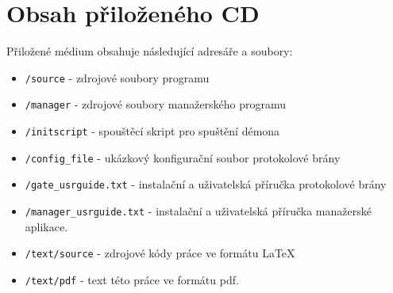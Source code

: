 \chapter{Obsah přiloženého CD}
\label{kap_obsah_cd}
Přiložené médium obsahuje následující adresáře a soubory:
\begin{itemize}
	\item \verb|/source| - zdrojové soubory programu
	\item \verb|/manager| - zdrojové soubory manažerského programu
	\item \verb|/initscript| - spouštěcí skript pro spuštění démona
	\item \verb|/config_file| - ukázkový konfigurační soubor protokolové brány
	\item \verb|/gate_usrguide.txt| - instalační a uživatelská příručka protokolové brány
	\item \verb|/manager_usrguide.txt| - instalační a uživatelská příručka manažerské aplikace.
\end{itemize}

\begin{itemize}
	\item \verb|/text/source| - zdrojové kódy práce ve formátu \LaTeX{}
	\item \verb|/text/pdf| - text této práce ve formátu pdf.
\end{itemize}



